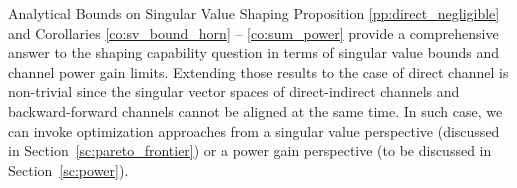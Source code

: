 \documentclass[journal]{IEEEtran}
\begin{document}
\begin{section}{Analytical Bounds on Singular Value Shaping}
		Proposition \ref{pp:direct_negligible} and Corollaries \ref{co:sv_bound_horn} -- \ref{co:sum_power} provide a comprehensive answer to the shaping capability question in terms of singular value bounds and channel power gain limits.
		Extending those results to the case of direct channel is non-trivial since the singular vector spaces of direct-indirect channels and backward-forward channels cannot be aligned at the same time.
		In such case, we can invoke optimization approaches from a singular value perspective (discussed in Section~\ref{sc:pareto_frontier}) or a power gain perspective (to be discussed in Section~\ref{sc:power}).


\end{section}
\end{document}
